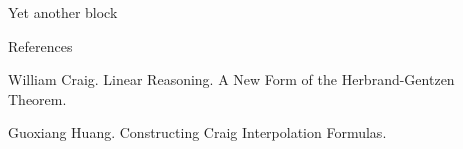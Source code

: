 \documentclass[final,hyperref={pdfpagelabels=true}]{beamer}
\newenvironment{postit}
{\begin{beamercolorbox}[sep=1em,wd=7cm]{postit}}
{\end{beamercolorbox}}
\begin{document}
\begin{frame}
\begin{columns}[t]
\begin{column}{.45\textwidth}
		\end{column}



		\begin{column}{.45\textwidth}
			\begin{block}{Yet another block}
				\lipsum[5-7]
			\end{block}



			\begin{block}{References}
				\begin{thebibliography}{999}

						William Craig. Linear Reasoning. A New Form of the Herbrand-Gentzen Theorem.

						Guoxiang Huang. Constructing Craig Interpolation Formulas.


				\end{thebibliography}
			\end{block}
		\end{column}
	\end{columns}


\end{frame}
\end{document}
